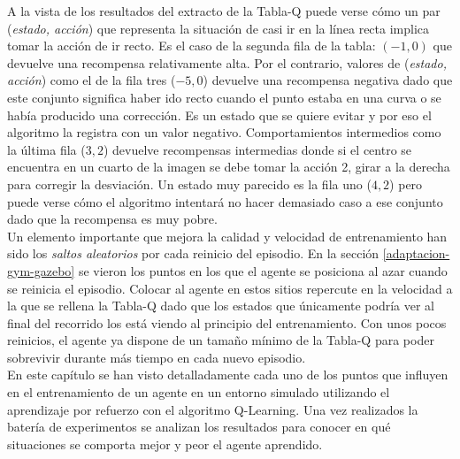 A la vista de los resultados del extracto de la Tabla-Q puede verse cómo un par (\textit{estado, acción}) que representa la situación de casi ir en la línea recta implica tomar la acción de ir recto. Es el caso de la segunda fila de la tabla: $(-1, 0)$ que devuelve una recompensa relativamente alta. Por el contrario, valores de (\textit{estado, acción}) como el de la fila tres ($-5,0$) devuelve una recompensa negativa dado que este conjunto significa haber ido recto cuando el punto estaba en una curva o se había producido una corrección. Es un estado que se quiere evitar y por eso el algoritmo la registra con un valor negativo. Comportamientos intermedios como la última fila ($3, 2$) devuelve recompensas intermedias donde si el centro se encuentra en un cuarto de la imagen se debe tomar la acción 2, girar a la derecha para corregir la desviación. Un estado muy parecido es la fila uno ($4,2$) pero puede verse cómo el algoritmo intentará no hacer demasiado caso a ese conjunto dado que la recompensa es muy pobre.\\

Un elemento importante que mejora la calidad y velocidad de entrenamiento han sido los \textit{saltos aleatorios} por cada reinicio del episodio. En la sección \ref{adaptacion-gym-gazebo} se vieron los puntos en los que el agente se posiciona al azar cuando se reinicia el episodio. Colocar al agente en estos sitios repercute en la velocidad a la que se rellena la Tabla-Q dado que los estados que únicamente podría ver al final del recorrido los está viendo al principio del entrenamiento. Con unos pocos reinicios, el agente ya dispone de un tamaño mínimo de la Tabla-Q para poder sobrevivir durante más tiempo en cada nuevo episodio.\\

En este capítulo se han visto detalladamente cada uno de los puntos que influyen en el entrenamiento de un agente en un entorno simulado utilizando el aprendizaje por refuerzo con el algoritmo Q-Learning. Una vez realizados la batería de experimentos se analizan los resultados para conocer en qué situaciones se comporta mejor y peor el agente aprendido.